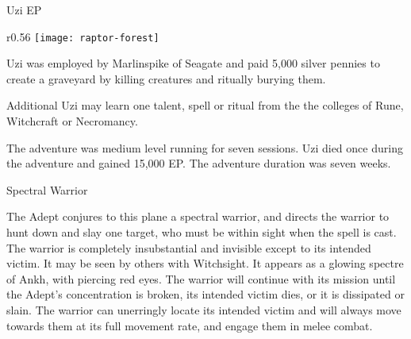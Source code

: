 \documentclass[a4paper]{article}
\begin{document}




\begin{ep-box}{Uzi EP}
\begin{minipage}{\linewidth}
  \setlength\intextsep{0pt}
  \begin{wraptext}{r}{0.56\textwidth}
    \texttt{[image: raptor-forest]}
  \end{wraptext}
Uzi was employed by Marlinspike of Seagate and paid 5,000 silver
pennies to create a graveyard by killing creatures and ritually
burying them.

Additional Uzi may learn one talent, spell or ritual from the the
colleges of Rune, Witchcraft or Necromancy.

The adventure was medium level running for seven sessions.  Uzi died
once during the adventure and gained 15,000 EP.  The adventure duration
was seven weeks.
\end{minipage}

\vspace{5mm}

\begin{minipage}{\linewidth}
\begin{multicols}{2}
\begin{spell*}[S-12]{Spectral Warrior}

\begin{effects}
The Adept conjures to this plane a spectral warrior, and directs the
warrior to hunt down and slay one target, who must be within sight
when the spell is cast.  The warrior is completely insubstantial and
invisible except to its intended victim.  It may be seen by others
with Witchsight.  It appears as a glowing spectre of Ankh, with
piercing red eyes.  The warrior will continue with its mission until
the Adept’s concentration is broken, its intended victim dies, or it
is dissipated or slain.  The warrior can unerringly locate its
intended victim and will always move towards them at its full movement
rate, and engage them in melee combat.


\end{effects}
\end{spell*}
\end{multicols}
\end{minipage}
\end{ep-box}
\end{document}
